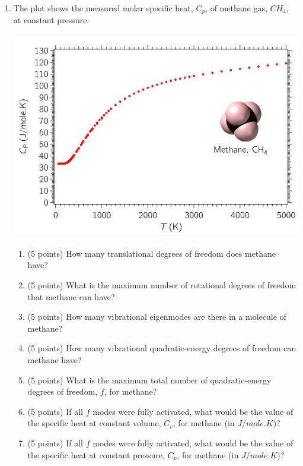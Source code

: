 \documentclass[fleqn]{article}
\begin{document}
\begin{enumerate}
    \pagebreak
    
    \item The plot shows the measured molar specific heat, $C_p$, of methane gas, $CH_4$, at constant pressure.
    \begin{center}
      \includegraphics[height=9cm, width=13cm]{question4.JPG}
    \end{center}
    \begin{enumerate}
      \item (5 points) How many translational degrees of freedom does methane have?

      \item (5 points) What is the maximum number of rotational degrees of freedom that methane can
      have?

      \item (5 points) How many vibrational eigenmodes are there in a molecule of methane?


      \item (5 points) How many vibrational quadratic-energy degrees of freedom can methane have?


      \item (5 points) What is the maximum total number of quadratic-energy degrees of freedom, $f$,
      for methane?


      \item (5 points) If all $f$ modes were fully activated, what would be the value of the specific heat
      at constant volume, $C_v$, for methane (in $J/mole.K$)?


      \item (5 points) If all $f$ modes were fully activated, what would be the value of the specific heat
      at constant pressure, $C_p$, for methane (in $J/mole.K$)?



\end{enumerate}
\end{enumerate}
\end{document}

